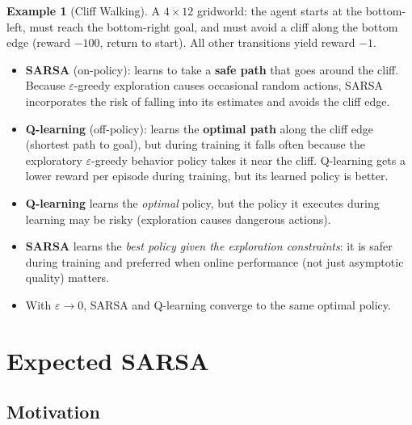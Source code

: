 \documentclass[11pt,a4paper]{article}
\theoremstyle{definition}
\newtheorem{example}{Example}[section]
\theoremstyle{plain}
\theoremstyle{remark}
\begin{document}
\begin{example}[Cliff Walking]
A $4 \times 12$ gridworld: the agent starts at the bottom-left, must reach the bottom-right goal, and must avoid a cliff along the bottom edge (reward $-100$, return to start). All other transitions yield reward $-1$.

\begin{itemize}
    \item \textbf{SARSA} (on-policy): learns to take a \textbf{safe path} that goes around the cliff. Because $\varepsilon$-greedy exploration causes occasional random actions, SARSA incorporates the risk of falling into its estimates and avoids the cliff edge.
    \item \textbf{Q-learning} (off-policy): learns the \textbf{optimal path} along the cliff edge (shortest path to goal), but during training it falls often because the exploratory $\varepsilon$-greedy behavior policy takes it near the cliff. Q-learning gets a lower reward per episode during training, but its learned policy is better.
\end{itemize}
\end{example}

\begin{tcolorbox}[colback=orange!5!white, colframe=orange!75!black, title={\textbf{On-Policy vs Off-Policy in Practice}}]
\begin{itemize}
    \item \textbf{Q-learning} learns the \textit{optimal} policy, but the policy it executes during learning may be risky (exploration causes dangerous actions).
    \item \textbf{SARSA} learns the \textit{best policy given the exploration constraints}: it is safer during training and preferred when online performance (not just asymptotic quality) matters.
    \item With $\varepsilon \to 0$, SARSA and Q-learning converge to the same optimal policy.
\end{itemize}
\end{tcolorbox}

\section{Expected SARSA}

\subsection{Motivation}
\end{document}
